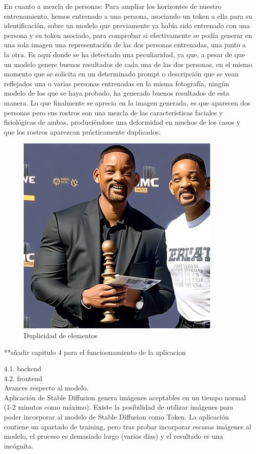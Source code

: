 En cuanto a mezcla de personas: Para ampliar los horizontes de nuestro entrenamiento, hemos entrenado a una persona, asociando un token a ella para su identificación, sobre un modelo que previamente ya había sido entrenado con una persona y su token asociado, para comprobar si efectivamente se podía generar en una sola imagen una representación de las dos personas entrenadas, una junto a la otra. Es aquí donde se ha detectado una peculiaridad, ya que, a pesar de que un modelo genere buenos resultados de cada una de las dos personas, en el mismo momento que se solicita en un determinado prompt o descripción que se vean reflejados una o varias personas entrenadas en la misma fotografía, ningún modelo de los que se haya probado, ha generado buenos resultados de esta manera. Lo que finalmente se aprecia en la imagen generada, es que aparecen dos personas pero sus rostros son una mezcla de las características faciales y fisiológicas de ambas, produciéndose una deformidad en muchos de los casos y que los rostros aparezcan prácticamente duplicados.
\begin{figure}[h]
	\centering
	\includegraphics[width = 0.4
	\textwidth]{Imagenes/Vectorial/duplicidad_will.png}
		\caption{Duplicidad de elementos}
	\label{fig:willpor2}
\end{figure}


**sñadir capitulo 4 para el funcioonamiento de la aplicacion

4.1. backend\\

4.2. frontend\\



Avances respecto al modelo.\\

Aplicación de Stable Diffusion genera imágenes aceptables en un tiempo normal (1-2 minutos como máximo). Existe la posibilidad de utilizar imágenes para poder incorporar al modelo de Stable Diffusion como Token. La aplicación contiene un apartado de training, pero tras probar incorporar escasas imágenes al modelo, el proceso es demasiado largo (varios días) y el resultado es una incógnita. \\

